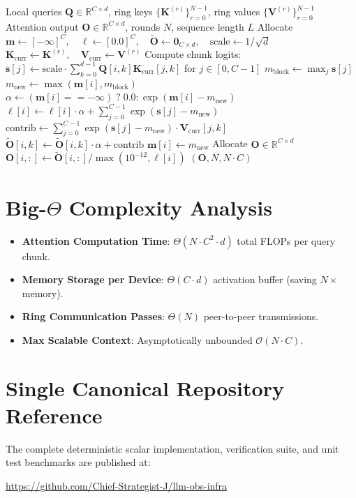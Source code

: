 \documentclass[11pt,a4paper]{article}
\theoremstyle{definition}
\begin{document}
\begin{algorithm}[H]
\caption{Ring Attention with Online Softmax Accumulation}
\begin{algorithmic}[1]
\Require Local queries $\mathbf{Q} \in \mathbb{R}^{C \times d}$, ring keys $\{\mathbf{K}^{(r)}\}_{r=0}^{N-1}$, ring values $\{\mathbf{V}^{(r)}\}_{r=0}^{N-1}$
\Ensure Attention output $\mathbf{O} \in \mathbb{R}^{C \times d}$, rounds $N$, sequence length $L$
\State Allocate $\mathbf{m} \gets [-\infty]^C, \quad \mathbf{\ell} \gets [0.0]^C, \quad \tilde{\mathbf{O}} \gets \mathbf{0}_{C \times d}, \quad \text{scale} \gets 1 / \sqrt{d}$
    \State $\mathbf{K}_{\text{curr}} \gets \mathbf{K}^{(r)}, \quad \mathbf{V}_{\text{curr}} \gets \mathbf{V}^{(r)}$
        \State Compute chunk logits: $\mathbf{s}[j] \gets \text{scale} \cdot \sum_{k=0}^{d-1} \mathbf{Q}[i, k] \mathbf{K}_{\text{curr}}[j, k]$ for $j \in [0, C-1]$
        \State $m_{\text{block}} \gets \max_j \mathbf{s}[j]$
        \State $m_{\text{new}} \gets \max(\mathbf{m}[i], m_{\text{block}})$
        \State $\alpha \gets (\mathbf{m}[i] == -\infty) \; ? \; 0.0 : \exp(\mathbf{m}[i] - m_{\text{new}})$
        \State $\mathbf{\ell}[i] \gets \mathbf{\ell}[i] \cdot \alpha + \sum_{j=0}^{C-1} \exp(\mathbf{s}[j] - m_{\text{new}})$
            \State $\text{contrib} \gets \sum_{j=0}^{C-1} \exp(\mathbf{s}[j] - m_{\text{new}}) \cdot \mathbf{V}_{\text{curr}}[j, k]$
            \State $\tilde{\mathbf{O}}[i, k] \gets \tilde{\mathbf{O}}[i, k] \cdot \alpha + \text{contrib}$
        \EndFor
        \State $\mathbf{m}[i] \gets m_{\text{new}}$
    \EndFor
\EndFor
\State Allocate $\mathbf{O} \in \mathbb{R}^{C \times d}$
    \State $\mathbf{O}[i, :] \gets \tilde{\mathbf{O}}[i, :] / \max(10^{-12}, \mathbf{\ell}[i])$
\EndFor
\State \Return $(\mathbf{O}, N, N \cdot C)$
\end{algorithmic}
\end{algorithm}

\section{Big-$\Theta$ Complexity Analysis}

\begin{itemize}
    \item \textbf{Attention Computation Time}: $\Theta(N \cdot C^2 \cdot d)$ total FLOPs per query chunk.
    \item \textbf{Memory Storage per Device}: $\Theta(C \cdot d)$ activation buffer (saving $N\times$ memory).
    \item \textbf{Ring Communication Passes}: $\Theta(N)$ peer-to-peer transmissions.
    \item \textbf{Max Scalable Context}: Asymptotically unbounded $\mathcal{O}(N \cdot C)$.
\end{itemize}

\section{Single Canonical Repository Reference}

The complete deterministic scalar implementation, verification suite, and unit test benchmarks are published at:
\begin{center}
\url{https://github.com/Chief-Strategist-J/llm-obs-infra}
\end{center}
\end{document}

